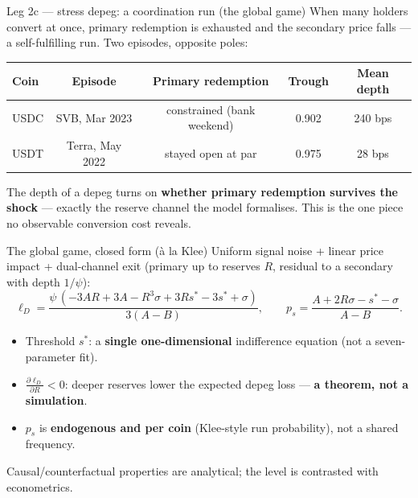 \documentclass[11pt,aspectratio=169]{beamer}
\begin{document}
\begin{frame}{Leg 2c --- stress depeg: a coordination run (the global game)}
When many holders convert at once, primary redemption is exhausted and the
secondary price falls --- a self-fulfilling run. Two episodes, opposite poles:
\begin{center}
\begin{tabular}{lcccc}
\toprule
Coin & Episode & Primary redemption & Trough & Mean depth \\
\midrule
USDC & SVB, Mar 2023   & constrained (bank weekend) & 0.902 & 240 bps \\
USDT & Terra, May 2022 & stayed open at par         & 0.975 & \phantom{0}28 bps \\
\bottomrule
\end{tabular}
\end{center}
\vspace{0.6em}
The depth of a depeg turns on \textbf{whether primary redemption survives the
shock} --- exactly the reserve channel the model formalises. This is the one
piece no observable conversion cost reveals.
\end{frame}

\begin{frame}{The global game, closed form (à la Klee)}
Uniform signal noise + linear price impact + dual-channel exit (primary up to
reserves \(R\), residual to a secondary with depth \(1/\psi\)):
\[
  \ell_D = \frac{\psi\,(-3AR + 3A - R^{3}\sigma + 3Rs^{*} - 3s^{*} + \sigma)}{3(A-B)},
  \qquad
  p_s = \frac{A + 2R\sigma - s^{*} - \sigma}{A - B}.
\]
\begin{itemize}
  \item Threshold \(s^{*}\): a \textbf{single one-dimensional} indifference equation (not a seven-parameter fit).
  \item \(\displaystyle \frac{\partial \ell_D}{\partial R} < 0\): deeper reserves lower the expected depeg loss --- \textbf{a theorem, not a simulation}.
  \item \(p_s\) is \textbf{endogenous and per coin} (Klee-style run probability), not a shared frequency.
\end{itemize}
\centering
\textcolor{game}{Causal/counterfactual properties are analytical; the level is contrasted with econometrics.}
\end{frame}
\end{document}
